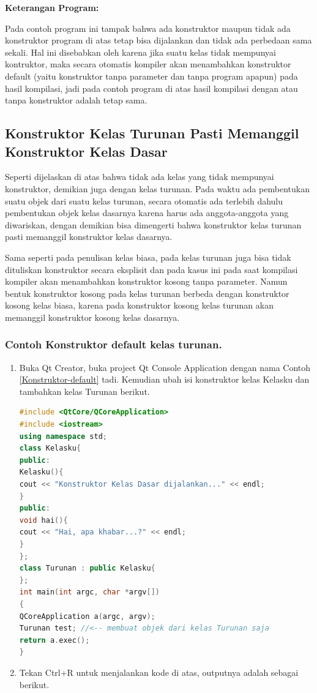 \textbf{Keterangan Program:}

Pada contoh program ini tampak bahwa ada konstruktor maupun tidak ada
konstruktor program di atas tetap bisa dijalankan dan tidak ada
perbedaan sama sekali. Hal ini disebabkan oleh karena jika suatu kelas
tidak mempunyai kontruktor, maka secara otomatis kompiler akan
menambahkan konstruktor default (yaitu konstruktor tanpa parameter dan
tanpa program apapun) pada hasil kompilasi, jadi pada contoh program di
atas hasil kompilasi dengan atau tanpa konstruktor adalah tetap sama.

\subsection{Konstruktor Kelas Turunan Pasti Memanggil Konstruktor
Kelas
Dasar}\label{konstruktor-kelas-turunan-pasti-memanggil-konstruktor-kelas-dasar}

Seperti dijelaskan di atas bahwa tidak ada kelas yang tidak mempunyai
konstruktor, demikian juga dengan kelas turunan. Pada waktu ada
pembentukan suatu objek dari suatu kelas turunan, secara otomatis ada
terlebih dahulu pembentukan objek kelas dasarnya karena harus ada
anggota-anggota yang diwariskan, dengan demikian bisa dimengerti bahwa
konstruktor kelas turunan pasti memanggil konstruktor kelas dasarnya.

Sama seperti pada penulisan kelas biasa, pada kelas turunan juga bisa
tidak dituliskan konstruktor secara eksplisit dan pada kasus ini pada
saat kompilasi kompiler akan menambahkan konstruktor kosong tanpa
parameter. Namun bentuk konstruktor kosong pada kelas turunan berbeda
dengan konstruktor kosong kelas biasa, karena pada konstruktor kosong
kelas turunan akan memanggil konstruktor kosong kelas dasarnya.

\subsubsection*{Contoh Konstruktor default kelas turunan.}

\begin{enumerate}
\def\labelenumi{\arabic{enumi}.}
\item
  Buka Qt Creator, buka project Qt Console Application dengan nama
  Contoh \ref{Konstruktor-default} tadi. Kemudian ubah isi konstruktor kelas Kelasku dan
  tambahkan kelas Turunan berikut.

\begin{lstlisting}[language=c++, caption=Konstruktor default kelas turunan, label=Konstruktor-default-kelas-turunan]
#include <QtCore/QCoreApplication>
#include <iostream>
using namespace std;
class Kelasku{
public:
Kelasku(){
cout << "Konstruktor Kelas Dasar dijalankan..." << endl;
}
public:
void hai(){
cout << "Hai, apa khabar...?" << endl;
}
};
class Turunan : public Kelasku{
};
int main(int argc, char *argv[])
{
QCoreApplication a(argc, argv);
Turunan test; //<-- membuat objek dari kelas Turunan saja
return a.exec();
}
\end{lstlisting}
\item
  Tekan Ctrl+R untuk menjalankan kode di atas, outputnya adalah sebagai
  berikut.
\end{enumerate}

